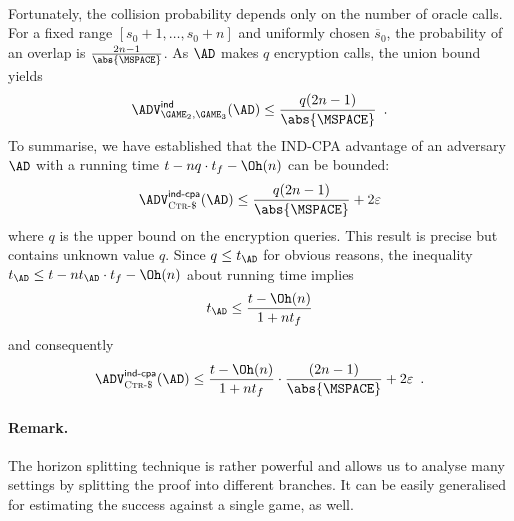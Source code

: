 \documentclass{crypto-exercise}
\newcommand{\CTRS}{\textsc{Ctr-\$}}
\begin{document}
\begin{solution}
\begin{align*}
\end{align*}
Fortunately, the collision probability depends only on the number of
oracle calls. For a fixed range $[s_0 + 1,\ldots, s_0 + n]$ and
uniformly chosen $\overline{s}_0$, the probability of an overlap is
$\frac{2n-1}{\abs{\MSPACE}}$. As $\AD$ makes $q$ encryption calls, the
union bound yields
\begin{align*}
 \advINDXX{\GAME_2,\GAME_3}{\AD}\leq\frac{q(2n-1)}{\abs{\MSPACE}}\enspace.
\end{align*}
To summarise, we have established that the IND-CPA advantage of an
adversary $\AD$ with a running time $t-nq\cdot t_f-\Oh(n)$ can be bounded:
\begin{align*}
  \advINDCPAXX{\CTRS}{\AD}\leq \frac{q(2n-1)}{\abs{\MSPACE}}+ 2\varepsilon
\end{align*}
where $q$ is the upper bound on the encryption queries. This result is
precise but contains unknown value $q$. Since $q\leq t_\AD$ for
obvious reasons, the inequality $t_\AD\leq t-nt_\AD\cdot t_f-\Oh(n)$
about running time implies
\begin{align*}
 t_\AD\leq\frac{t-\Oh(n)}{1+n t_f}
\end{align*}
and consequently
\begin{align*}
  \advINDCPAXX{\CTRS}{\AD}\leq \frac{t-\Oh(n)}{1+n t_f}\cdot\frac{(2n-1)}{\abs{\MSPACE}}+ 2\varepsilon\enspace.
\end{align*}

\paragraph{Remark.} The horizon splitting technique is rather powerful
and allows us to analyse many settings by splitting the proof into
different branches. It can be easily generalised for estimating the
success against a single game, as well.
\end{solution}
\end{document}
